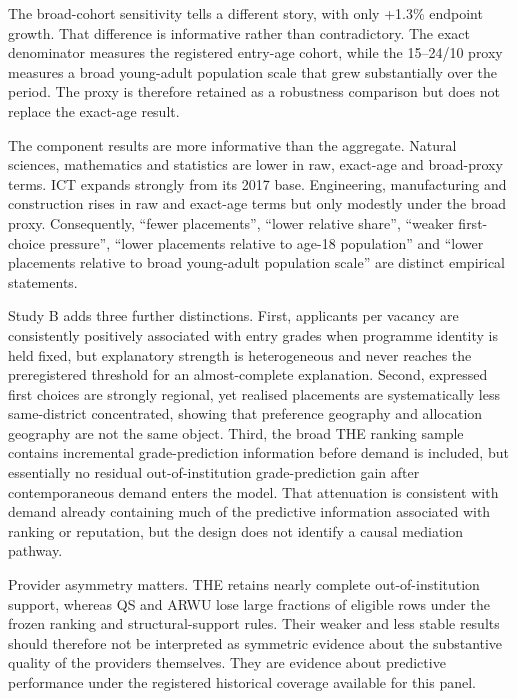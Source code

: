 \documentclass[11pt,a4paper]{article}
\begin{document}
The broad-cohort sensitivity tells a different story, with only +1.3\% endpoint growth. That difference is informative rather than contradictory. The exact denominator measures the registered entry-age cohort, while the 15--24/10 proxy measures a broad young-adult population scale that grew substantially over the period. The proxy is therefore retained as a robustness comparison but does not replace the exact-age result.

The component results are more informative than the aggregate. Natural sciences, mathematics and statistics are lower in raw, exact-age and broad-proxy terms. ICT expands strongly from its 2017 base. Engineering, manufacturing and construction rises in raw and exact-age terms but only modestly under the broad proxy. Consequently, ``fewer placements'', ``lower relative share'', ``weaker first-choice pressure'', ``lower placements relative to age-18 population'' and ``lower placements relative to broad young-adult population scale'' are distinct empirical statements.

Study B adds three further distinctions. First, applicants per vacancy are consistently positively associated with entry grades when programme identity is held fixed, but explanatory strength is heterogeneous and never reaches the preregistered threshold for an almost-complete explanation. Second, expressed first choices are strongly regional, yet realised placements are systematically less same-district concentrated, showing that preference geography and allocation geography are not the same object. Third, the broad THE ranking sample contains incremental grade-prediction information before demand is included, but essentially no residual out-of-institution grade-prediction gain after contemporaneous demand enters the model. That attenuation is consistent with demand already containing much of the predictive information associated with ranking or reputation, but the design does not identify a causal mediation pathway.

Provider asymmetry matters. THE retains nearly complete out-of-institution support, whereas QS and ARWU lose large fractions of eligible rows under the frozen ranking and structural-support rules. Their weaker and less stable results should therefore not be interpreted as symmetric evidence about the substantive quality of the providers themselves. They are evidence about predictive performance under the registered historical coverage available for this panel.
\end{document}

